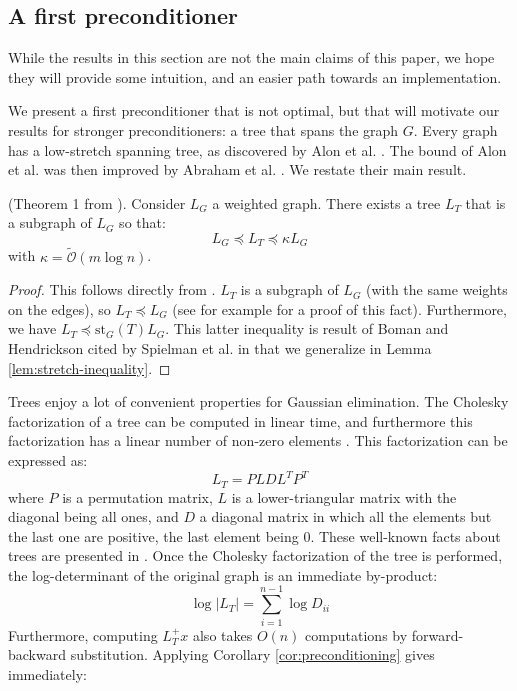 
\subsection{A first preconditioner\label{sec:A-first-preconditioner}}

While the results in this section are not the main claims of this
paper, we hope they will provide some intuition, and an easier path
towards an implementation.

We present a first preconditioner that is not optimal, but that will
motivate our results for stronger preconditioners: a tree that spans
the graph $G$. Every graph has a low-stretch spanning tree, as discovered
by Alon et al. \cite{Alon1995}. The bound of Alon et al. was then
improved by Abraham et al. \cite{Abraham2008}. We restate their main
result. \begin{lemma}(Theorem 1 from \cite{Abraham2008}). Consider
$L_{G}$ a weighted graph. There exists a tree $L_{T}$ that is a
subgraph of $L_{G}$ so that: 
\[
L_{G}\preceq L_{T}\preceq\kappa L_{G}
\]
with $\kappa = \tilde{\mathcal{O}}\left(m\log n\right)$. %
\end{lemma} 

\begin{proof} This follows directly from \cite{Abraham2008}. $L_{T}$
is a subgraph of $L_{G}$ (with the same weights on the edges), so
$L_{T}\preceq L_{G}$ (see \cite{Spielman2009a} for example for a
proof of this fact). Furthermore, we have $L_{T}\preceq\text{st}_{G}\left(T\right)L_{G}$.
This latter inequality is result of Boman and Hendrickson \cite{Boman2004}
cited by Spielman et al. in \cite{Spielman2010} that we generalize
in Lemma \ref{lem:stretch-inequality}. \end{proof}

Trees enjoy a lot of convenient properties for Gaussian elimination.
The Cholesky factorization of a tree can be computed in linear time,
and furthermore this factorization has a linear number of non-zero
elements \cite{Spielman2009a}. This factorization can be expressed
as: 
\[
L_{T}=PLDL^{T}P^{T}
\]
where $P$ is a permutation matrix, $L$ is a lower-triangular matrix
with the diagonal being all ones, and $D$ a diagonal matrix in which
all the elements but the last one are positive, the last element being
$0$. These well-known facts about trees are presented in \cite{Spielman2009a}.
Once the Cholesky factorization of the tree is performed, the log-determinant
of the original graph is an immediate by-product: 
\[
\log\left|L_{T}\right|=\sum_{i=1}^{n-1}\log D_{ii}
\]
Furthermore, computing $L_{T}^{+}x$ also takes $O\left(n\right)$
computations by forward-backward substitution. Applying Corollary
\ref{cor:preconditioning} gives immediately: 

